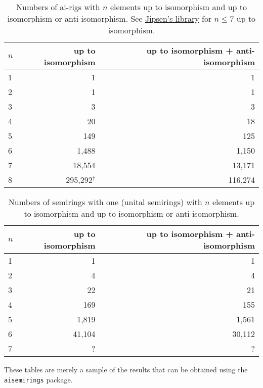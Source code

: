 \documentclass{article}
\theoremstyle{definition}
\theoremstyle{plain}
\begin{document}
\begin{table}[ht]
  \centering
  \begin{tabular}{l|r|r}
    \toprule
    $n$ & up to isomorphism & up to isomorphism + anti-isomorphism \\
    \midrule
    1 & 1         & 1      \\
    2 & 1         & 1      \\
    3 & 3         & 3      \\
    4 & 20        & 18     \\
    5 & 149       & 125    \\
    6 & 1,488     & 1,150  \\
    7 & 18,554    & 13,171 \\
    8 & 295,292$^\dagger$   & 116,274      \\
  \end{tabular}
  \caption{Numbers of ai-rigs with $n$ elements up to isomorphism and up
    to isomorphism or anti-isomorphism. See
    \href{https://math.chapman.edu/~jipsen/structures/doku.php?id=idempotent_semirings_with_identity_and_zero\#finite_members}{Jipsen's
  library} for \(n\leq7\) up to isomorphism.}
  \label{tab:ai-rigs}
\end{table}

\begin{table}[h]
  \centering
  \begin{tabular}{l|r|r}
    \toprule
    $n$ & up to isomorphism & up to isomorphism + anti-isomorphism \\
    \midrule
    1 & 1         & 1      \\
    2 & 4         & 4      \\
    3 & 22        & 21     \\
    4 & 169       & 155    \\
    5 & 1,819     & 1,561  \\
    6 & 41,104    & 30,112 \\
    7 & ?         & ?      \\
  \end{tabular}
  \caption{Numbers of semirings with one (unital semirings) with $n$
  elements up to isomorphism and up to isomorphism or anti-isomorphism.}
  \label{tab:unital-semirings}
\end{table}

These tables are merely a sample of the results that can be obtained
using the \texttt{aisemirings} package.
\end{document}
